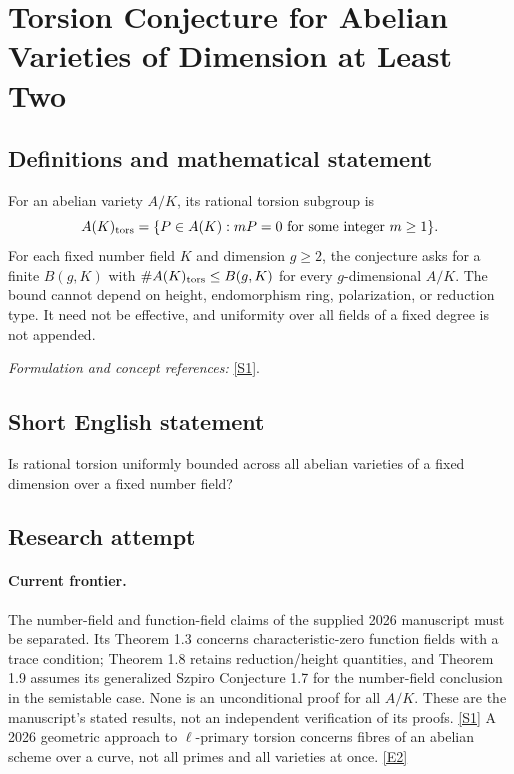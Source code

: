\documentclass[11pt,a4paper]{article}
\newcommand{\sref}[2]{\hyperlink{source:#1:#2}{[S#2]}}
\newcommand{\eref}[2]{\hyperlink{extra:#1:#2}{[E#2]}}
\newif\ifshowcatalogue
\newcommand{\cataloguescope}[1]{\ifshowcatalogue
 \paragraph{Exact scope in the supplied catalogue.}
 \begin{quote}\small #1\end{quote}\fi}
\numberwithin{equation}{section}
\begin{document}
\setcounter{section}{0}
\clearpage
\section*{\texorpdfstring{Torsion Conjecture for Abelian Varieties of Dimension at Least Two}{Torsion Conjecture for Abelian Varieties of Dimension at Least Two}}\label{30006748}
\subsection{Definitions and mathematical statement}
For an abelian variety $A/K$, its rational torsion subgroup is
\[
 A(K)_{\rm tors}=\{P\in A(K):mP=0\text{ for some integer }m\ge1\}.
\]
For each fixed number field $K$ and dimension $g\ge2$, the conjecture asks for a finite $B(g,K)$ with $\#A(K)_{\rm tors}\le B(g,K)$ for every $g$-dimensional $A/K$. The bound cannot depend on height, endomorphism ring, polarization, or reduction type. It need not be effective, and uniformity over all fields of a fixed degree is not appended.
\par\smallskip\textit{Formulation and concept references:} \sref{30006748}{1}.
\cataloguescope{For every integer g>=2 and every number field K, there exists a finite constant B(g,K) such that every abelian variety A defined over K of dimension g satisfies \#A(K)\_tors <= B(g,K). Here A(K)\_tors is the subgroup of K-rational torsion points. The bound is uniform over all such A, without dependence on A, its height, endomorphisms, polarization degree or reduction type; it may depend on g and K. No effective formula, explicit numerical value or classification of torsion groups is required.}
\subsection{Short English statement}
Is rational torsion uniformly bounded across all abelian varieties of a fixed dimension over a fixed number field?
\subsection{Research attempt}

\paragraph{Current frontier.}
The number-field and function-field claims of the supplied 2026 manuscript
must be separated. Its Theorem 1.3 concerns characteristic-zero function
fields with a trace condition; Theorem 1.8 retains reduction/height quantities,
and Theorem 1.9 assumes its generalized Szpiro Conjecture 1.7 for the
number-field conclusion in the semistable case. None is an unconditional
proof for all $A/K$. These are the manuscript's stated results, not an
independent verification of its proofs. \sref{30006748}{1}
A 2026 geometric approach to $\ell$-primary torsion concerns fibres of an
abelian scheme over a curve, not all primes and all varieties at once.
\eref{30006748}{2}
\end{document}
